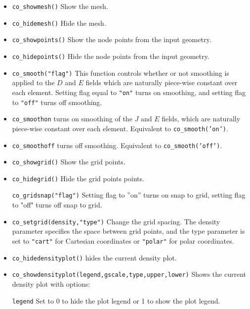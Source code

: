 \begin{itemize}
\item \texttt{co\_showmesh()} Show the mesh.

\item \texttt{co\_hidemesh()} Hide the mesh.

\item \texttt{co\_showpoints()} Show the node points from the input geometry.

\item \texttt{co\_hidepoints()} Hide the node points from the input geometry.

\item \texttt{co\_smooth("flag")} This function controls whether or not smoothing is
applied to the $D$ and $E$ fields which are naturally piece-wise
constant over each element. Setting flag equal to \texttt{"on"}
turns on smoothing, and setting flag to \texttt{"off"} turns off
smoothing.

\item{\tt co\_smoothon} turns on smoothing of the $J$ and $E$ fields, which are naturally piece-wise constant over each element. Equivalent to {\tt co\_smooth('on')}.

\item{\tt co\_smoothoff} turns off smoothing. Equivalent to {\tt co\_smooth('off')}.

\item \texttt{co\_showgrid()} Show the grid points.

\item \texttt{co\_hidegrid()} Hide the grid points points.

\texttt{co\_gridsnap("flag")} Setting flag to ''on'' turns on snap to grid,
setting flag to "off" turns off snap to grid.

\item \texttt{co\_setgrid(density,"type")} Change the grid spacing. The density
parameter specifies the space between grid points, and the type
parameter is set to \texttt{"cart"} for Cartesian coordinates or
\texttt{"polar"} for polar coordinates.

\item \texttt{co\_hidedensityplot()} hides the current density plot.

\item \texttt{co\_showdensityplot(legend,gscale,type,upper,lower)} Shows the
current density plot with options:

\texttt{legend} Set to 0 to hide the plot legend or 1 to show the plot
legend.


\end{itemize}
